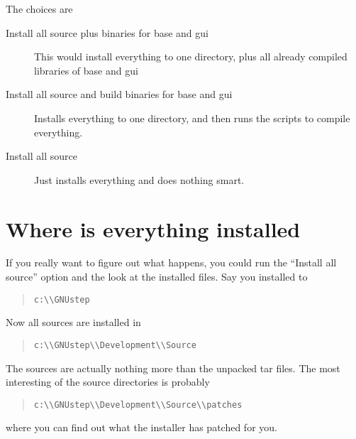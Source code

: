 \documentclass{article}
\begin{document}
The choices are

\begin{description}
\item[Install all source plus binaries for base and gui] This would install everything to one directory, plus all already
compiled libraries of base and gui
\end{description}

\begin{description}
\item[Install all source and build binaries for base and gui] Installs everything to one directory, and then runs the scripts to
compile everything.
\end{description}

\begin{description}
\item[Install all source] Just installs everything and does nothing smart.
\end{description}


\section{Where is everything installed}
If you really want to figure out what happens, you could run the
``Install all source'' option and the look at the installed files. Say
you installed to \begin{quote}
\begin{verbatim}c:\\GNUstep\end{verbatim}
\end{quote}

Now all sources are installed in \begin{quote}
\begin{verbatim}c:\\GNUstep\\Development\\Source\end{verbatim}
\end{quote} The
sources are actually nothing more than the unpacked tar files.
The most interesting of the source directories is probably
\begin{quote}
\begin{verbatim}c:\\GNUstep\\Development\\Source\\patches\end{verbatim}
\end{quote} where you can find out what the
installer has patched for you.
\end{document}
